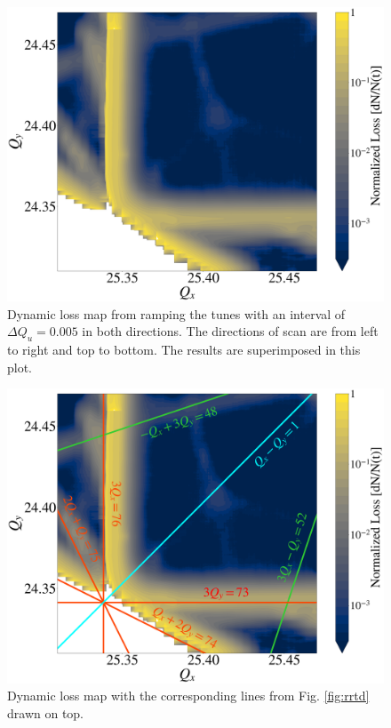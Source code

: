 \begin{figure}[H]
    \centering
    \includegraphics[width=\columnwidth]{chapter4/bare.png}
    \caption{Dynamic loss map from ramping the tunes with an interval of $\Delta Q_u=0.005$ in both directions. The directions of scan are from left to right and top to bottom. The results are superimposed in this plot.}
    \label{fig:bare_nocomments}
\end{figure}

\begin{figure}[H]
    \centering
    \includegraphics[width=\columnwidth]{chapter4/bare_comments.png}
    \caption{Dynamic loss map with the corresponding lines from Fig. \ref{fig:rrtd} drawn on top.}
    \label{fig:bare_comments}
\end{figure}


